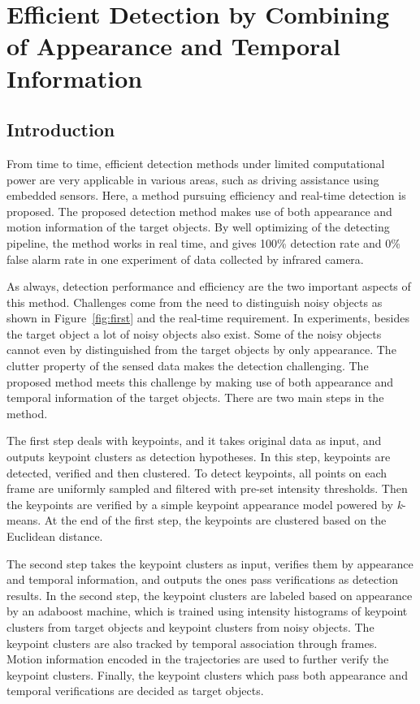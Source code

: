 \chapter{Efficient Detection by Combining of Appearance and Temporal Information }
\label{chp3}

\section{Introduction}

From time to time, efficient detection methods under limited computational power are very applicable in various areas, such as driving assistance using embedded sensors. Here, a method pursuing efficiency and real-time detection is proposed.
The proposed detection method makes use of both
appearance and motion information of the target objects. By well optimizing of the detecting pipeline, the
method works in real time, and gives 100\% detection rate and 0\% false alarm rate in one experiment of data collected by infrared camera.

As always, detection performance and efficiency are the two important aspects of this method. Challenges come from the need to distinguish noisy objects as shown in Figure~\ref{fig:first} and the real-time requirement. In experiments, besides the target object a lot of noisy objects also exist. Some of the noisy objects cannot even by distinguished from the target objects by only appearance.  The clutter property of the sensed data makes the detection challenging. The proposed method meets this challenge by making use of both appearance and temporal information of the target objects. There are two main steps in the method.

The first step deals with keypoints, and  it takes original data as input, and outputs keypoint clusters as detection hypotheses. In this step, keypoints are detected, verified and then clustered. To detect keypoints, all points on each frame are uniformly sampled and filtered with pre-set intensity thresholds.  Then the keypoints are verified by a simple keypoint appearance model   powered by \emph{k}-means. At the end of the first step, the keypoints are clustered based on the Euclidean distance. 

The second step takes the keypoint clusters as input, verifies them by appearance and temporal information, and outputs the ones pass verifications as detection results. In the second step, the keypoint clusters are labeled based on appearance by an adaboost machine, which is trained using intensity histograms of keypoint clusters from target objects and keypoint clusters from noisy objects. The keypoint clusters are also tracked by temporal association through frames. Motion information encoded in the trajectories are used to further verify the keypoint clusters. Finally, the keypoint clusters which pass both appearance and temporal verifications are decided as target objects.

